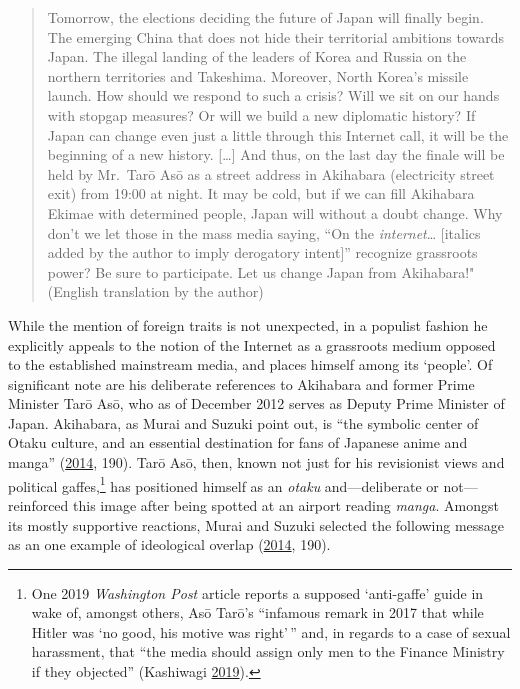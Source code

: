 \documentclass[10pt,british,A4paper,,openany]{memoir}
\begin{document}
\begin{quote}
Tomorrow, the elections deciding the future of Japan will finally begin.
The emerging China that does not hide their territorial ambitions
towards Japan. The illegal landing of the leaders of Korea and Russia on
the northern territories and Takeshima. Moreover, North Korea's missile
launch. How should we respond to such a crisis? Will we sit on our hands
with stopgap measures? Or will we build a new diplomatic history? If
Japan can change even just a little through this Internet call, it will
be the beginning of a new history. {[}\ldots{}{]} And thus, on the last
day the finale will be held by Mr.~Tarō Asō as a street address in
Akihabara (electricity street exit) from 19:00 at night. It may be cold,
but if we can fill Akihabara Ekimae with determined people, Japan will
without a doubt change. Why don't we let those in the mass media saying,
``On the \emph{internet}\ldots{} {[}italics added by the author to imply
derogatory intent{]}'' recognize grassroots power? Be sure to
participate. Let us change Japan from Akihabara!" (English translation
by the author)
\end{quote}

While the mention of foreign traits is not unexpected, in a populist
fashion he explicitly appeals to the notion of the Internet as a
grassroots medium opposed to the established mainstream media, and
places himself among its `people'. Of significant note are his
deliberate references to Akihabara and former Prime Minister Tarō Asō,
who as of December 2012 serves as Deputy Prime Minister of Japan.
Akihabara, as Murai and Suzuki point out, is ``the symbolic center of
Otaku culture, and an essential destination for fans of Japanese anime
and manga'' (\protect\hyperlink{ref-hollihan_how_2014}{2014}, 190). Tarō
Asō, then, known not just for his revisionist views and political
gaffes,\footnote{One 2019 \emph{Washington Post} article reports a
  supposed `anti-gaffe' guide in wake of, amongst others, Asō Tarō's
  ``infamous remark in 2017 that while Hitler was `no good, his motive
  was right'\,'' and, in regards to a case of sexual harassment, that
  ``the media should assign only men to the Finance Ministry if they
  objected'' (Kashiwagi
  \protect\hyperlink{ref-kashiwagi_japan_2019}{2019}).} has positioned
himself as an \emph{otaku} and---deliberate or not---reinforced this
image after being spotted at an airport reading \emph{manga}. Amongst
its mostly supportive reactions, Murai and Suzuki selected the following
message as an one example of ideological overlap
(\protect\hyperlink{ref-hollihan_how_2014}{2014}, 190).
\end{document}
